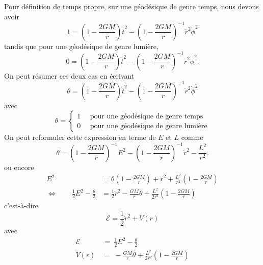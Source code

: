\documentclass[a4paper,11pt]{report}
\theoremstyle{definition}
\theoremstyle{plain}
\theoremstyle{definition}
\theoremstyle{remark}
\begin{document}
            Pour définition de temps propre, sur une géodésique de genre temps, nous devons avoir
            \begin{equation}
                1 = \left( 1-\frac{2GM}{r} \right)\dot{t}^2-\left( 1-\frac{2GM}{r} \right)^{-1}\dot{r}^2\dot{\phi}^2
            \end{equation}
            tandis que pour une géodésique de genre lumière,
            \begin{equation}
                0 = \left( 1-\frac{2GM}{r} \right)\dot{t}^2-\left( 1-\frac{2GM}{r} \right)^{-1}\dot{r}^2\dot{\phi}^2.
            \end{equation}
            On peut résumer ces deux cas en écrivant
            \begin{equation}
                \theta = \left( 1-\frac{2GM}{r} \right)\dot{t}^2-\left( 1-\frac{2GM}{r} \right)^{-1}\dot{r}^2\dot{\phi}^2
            \end{equation}
            avec 
            \begin{equation}
                \theta =
                \begin{cases}
                    1 \quad\text{ pour une géodésique de genre temps}\\
                    0 \quad\text{ pour une géodésique de genre lumière}
                \end{cases}
            \end{equation}
            On peut reformuler cette expression en terme de $E$ et $L$ comme
            \begin{equation}
                \theta = \left( 1-\frac{2GM}{r} \right)^{-1} E^2-\left( 1-\frac{2GM}{r} \right)^{-1}\dot{r}^2-\frac{L^2}{r^2}.
            \end{equation}
            ou encore
            \begin{align}
                E^2 &= \theta \left( 1-\frac{2GM}{r} \right)+\dot{r}^2+\frac{L^2}{r^2}\left( 1-\frac{2GM}{r} \right)\\
                \Leftrightarrow\qquad \frac{1}{2}E^2-\frac{\theta}{2} &= \frac{1}{2}\dot{r}^2-\frac{GM}{r}\theta+\frac{L^2}{2r^2}\left( 1-\frac{2GM}{r} \right)
            \end{align}
            c'est-à-dire
            \begin{equation}
                \mathscr{E} = \frac{1}{2}\dot{r}^2 + V(r)
            \end{equation}
            avec 
            \begin{align}
                \mathscr{E} &~\hat{=}~ \frac{1}{2}E^2-\frac{\theta}{2}\\
                V(r) &~\hat{=}~ -\frac{GM}{r}\theta+\frac{L^2}{2r^2}\left( 1-\frac{2GM}{r} \right)
            \end{align}
\end{document}

